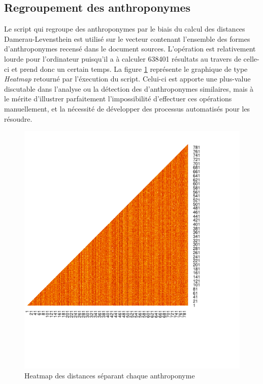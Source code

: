 \subsection{Regroupement des anthroponymes}
Le script qui regroupe des anthroponymes par le biais du calcul des distances Damerau-Levensthein est utilisé sur le vecteur contenant l'ensemble des formes d'anthroponymes recensé dans le document sources. L'opération est relativement lourde pour l'ordinateur puisqu'il a à calculer 638401 résultats au travers de celle-ci et prend donc un certain temps. La figure \ref{heatmap_anthro} représente le graphique de type \textit{Heatmap} retourné par l'éxecution du script. Celui-ci est apporte une plus-value discutable dans l'analyse ou la détection des d'anthroponymes similaires, mais à le mérite d'illustrer parfaitement l'impossibilité d'effectuer ces opérations manuellement, et la nécessité de développer des processus automatisés pour les résoudre.
\begin{figure}
    \centering
    \includegraphics [scale=1.5]{3.Results/Img/heatmap.pdf}
    \caption{Heatmap des distances séparant chaque anthroponyme}
    \label{heatmap_anthro}
\end{figure}

